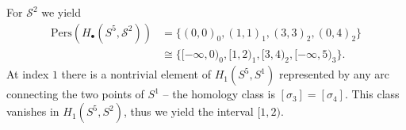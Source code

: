 \begin{example}{\cite[\S 2.4, Example]{de2011dualities}}
	For $\mathcal{S}^{2}$ we yield
	\begin{align}
		\mathrm{Pers}(H_{\bullet}(S^{5},\mathcal{S}^{2})) & = \{(0,0)_{0}, (1,1)_{1}, (3,3)_{2}, (0,4)_{2}\}               \\
		                                                  & \cong \{[-\infty, 0)_{0}, [1,2)_{1}, [3,4)_{2}, [-\infty,5)_{3}\}.
	\end{align}
	At index $1$ there is a nontrivial element of $H_{1}(S^{5},S^{1})$ represented
	by any arc connecting the two points of $S^{1}$ --
	the homology class is $[\sigma_{3}] = [\sigma_{4}]$. This class vanishes in $H_{1}(S^{5},S^{2})$, thus we yield the interval $[1,2)$.
\end{example}

